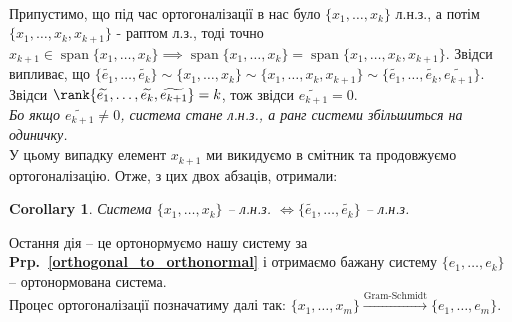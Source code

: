\documentclass[a4paper, 10pt]{article}
\theoremstyle{theoremdd}
\newtheorem{corollary}[theorem]{Corollary}
\newcommand\prpref[1]{\textbf{Prp.~\ref{#1}}}
\DeclareMathOperator{\linspan}{span}
\begin{document}
\bigskip \\
Припустимо, що під час ортогоналізації в нас було $\{x_1,\dots,x_k\}$ л.н.з., а потім $\{x_1,\dots,x_k, x_{k+1}\}$ - раптом л.з., тоді точно $x_{k+1} \in \linspan \{x_1,\dots,x_k\} \implies \linspan \{x_1,\dots,x_k\} = \linspan \{x_1,\dots,x_k,x_{k+1}\}$. Звідси випливає, що $\{\widetilde{e_1},\dots,\widetilde{e_k}\} \sim \{x_1,\dots,x_k\} \sim \{x_1,\dots,x_k,x_{k+1}\} \sim \{\widetilde{e_1},\dots,\widetilde{e_k},\widetilde{e_{k+1}}\}$. Звідси $\rank \{\widetilde{e_1},\dots,\widetilde{e_k},\widetilde{e_{k+1}}\} = k$, тож звідси $\widetilde{e_{k+1}} = 0$.\\
\textit{Бо якщо $\widetilde{e_{k+1}} \neq 0$, система стане л.н.з., а ранг системи збільшиться на одиничку.}\\
У цьому випадку елемент $x_{k+1}$ ми викидуємо в смітник та продовжуємо ортогоналізацію. Отже, з цих двох абзаців, отримали:

\begin{corollary}
Система $\{x_1,\dots,x_k\}$ -- л.н.з. $\iff \{\widetilde{e_1},\dots,\widetilde{e_k}\}$ -- л.н.з.
\end{corollary}
\noindent
Остання дія -- це ортонормуємо нашу систему за \prpref{orthogonal_to_orthonormal} і отримаємо бажану систему $\{e_1,\dots,e_k\}$ -- ортонормована система.
\bigskip \\
Процес ортогоналізації позначатиму далі так: $\{x_1,\dots,x_m\} \xrightarrow{\text{Gram-Schmidt}} \{e_1,\dots,e_m\}$.
\end{document}
